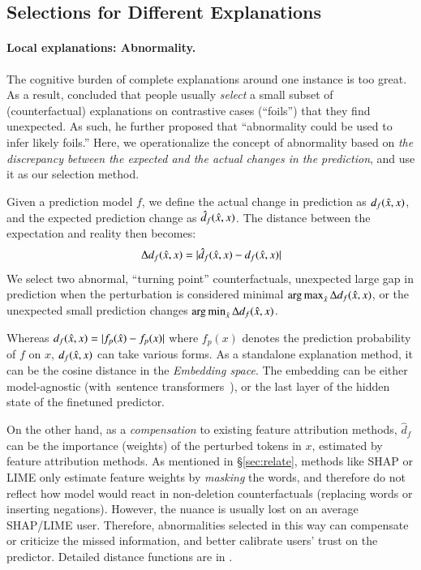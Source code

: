 \subsection{Selections for Different Explanations}

\paragraph{Local explanations: Abnormality.}
The cognitive burden of complete explanations around one instance is too great.
As a result, \citet{miller} concluded that people usually \emph{select} a small subset of (counterfactual) explanations on contrastive cases (``foils'') that they find unexpected. 
As such, he further proposed that ``abnormality could be used to infer likely foils.''
Here, we operationalize the concept of abnormality based on \emph{the discrepancy between the expected and the actual changes in the prediction}, and use it as our selection method.

Given a prediction model $f$, we define the actual change in prediction as $d_f(\hat{x}, x)$, and the expected prediction change as $\hat{d}_f(\hat{x}, x)$.
The distance between the expectation and reality then becomes:
$$\Delta d_f(\hat{x}, x) = |\hat{d}_f(\hat{x}, x)-d_f(\hat{x}, x)|$$
We select two abnormal, ``turning point'' counterfactuals, \ie unexpected large gap in prediction when the perturbation is considered minimal $\operatorname*{arg\,max}_{\hat{x}} \Delta d_f(\hat{x}, x)$, or the unexpected small prediction changes $\operatorname*{arg\,min}_{\hat{x}} \Delta d_f(\hat{x}, x)$.

Whereas $d_f(\hat{x}, x)=|f_p(\hat{x})-f_p(x)|$ where $f_p(x)$ denotes the prediction probability of $f$ on $x$, $d_f(\hat{x}, x)$ can take various forms. 
As a standalone explanation method, it can be the cosine distance in the \emph{Embedding space}.
The embedding can be either model-agnostic (\eg with~sentence transformers~\cite{reimers-2019-sentence-bert}), or the last layer of the hidden state of the finetuned predictor.

On the other hand, as a \emph{compensation} to existing feature attribution methods, $\hat{d}_f$ can be the importance (weights) of the perturbed tokens in $x$, estimated by feature attribution methods.
As mentioned in \S\ref{sec:relate}, methods like SHAP or LIME only estimate feature weights by \emph{masking} the words, and therefore do not reflect how model would react in non-deletion counterfactuals (replacing words or inserting negations).
However, the nuance is usually lost on an average SHAP/LIME user.
Therefore, abnormalities selected in this way can compensate or criticize the missed information, and better calibrate users' trust on the predictor. 
Detailed distance functions are in \tofix{\S\ref{X}}.



